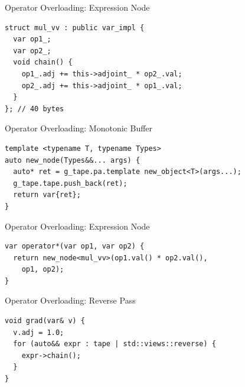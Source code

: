 \documentclass[dvipsnames, aspectratio=169]{beamer}
\newenvironment{CacheLine}[1][]{
  \begin{tikzpicture}[x=1.2cm,y=0.8cm,font=\footnotesize,>=Stealth,#1]
    \def\CacheH{1.0}   %
    \def\CacheBelow{1.0} %

}{
    \foreach \i in {1,...,7} { \draw[black!40] (\i,0) -- (\i,\CacheH); }
    \draw[line width=0.6pt, rounded corners=2pt] (0,0) rectangle (8,\CacheH);
    \foreach \i in {0,...,7} {
      \node[below=3pt, text=black!75] at (\i+0.5,0) {8B \i};
    }
  \end{tikzpicture}
}
\newcommand{\CacheColor}[2]{%
  \fill[#2, fill opacity=0.35, draw=none] (#1,0) rectangle ++(1,\CacheH);%
}
\newcommand{\CacheMarkBelow}[3][green!60!black]{%
  \draw[-{Stealth[length=3mm]}, very thick, draw=#1] (#2,-\CacheBelow+0.28) -- (#2,0.02);
  \node[below, anchor=west, text=#1] at (#2,-\CacheBelow-0.2) {#3};
}
\newcommand{\CacheSetBelow}[1]{\def\CacheBelow{#1}}
\begin{document}
\begin{frame}[fragile]{Operator Overloading: Expression Node}
\begin{verbatim}
struct mul_vv : public var_impl {
  var op1_;
  var op2_;
  void chain() {
    op1_.adj += this->adjoint_ * op2_.val;
    op2_.adj += this->adjoint_ * op1_.val;
  }
}; // 40 bytes
\end{verbatim}
\end{frame}


\begin{frame}[fragile]{Operator Overloading: Monotonic Buffer}
\begin{verbatim}
template <typename T, typename Types>
auto new_node(Types&&... args) {
  auto* ret = g_tape.pa.template new_object<T>(args...);
  g_tape.tape.push_back(ret);
  return var{ret};
}
\end{verbatim}
\end{frame}

\begin{frame}[fragile]{Operator Overloading: Expression Node}
\begin{verbatim}
var operator*(var op1, var op2) {
  return new_node<mul_vv>(op1.val() * op2.val(),
    op1, op2);
}
\end{verbatim}
\end{frame}

\begin{frame}[fragile]{Operator Overloading: Reverse Pass}
\begin{verbatim}
void grad(var& v) {
  v.adj = 1.0;
  for (auto&& expr : tape | std::views::reverse) {
    expr->chain();
  }
}
\end{verbatim}
\end{frame}
\end{document}
